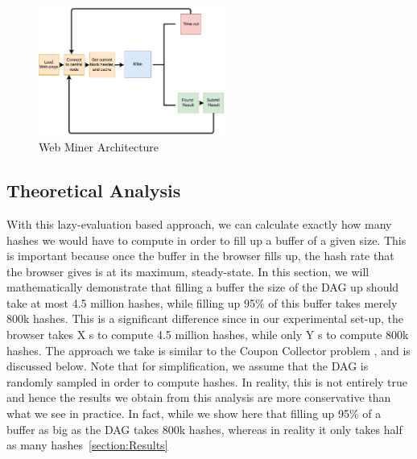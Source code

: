 \documentclass[runningheads]{llncs}
\begin{document}
\begin{figure}[h]
\centering
\includegraphics[width=230px,keepaspectratio]{Hybrid-Miner.pdf}
\caption{\label{fig:hybridArchitecture} Web Miner Architecture}
\end{figure}

\subsection{Theoretical Analysis}
With this lazy-evaluation based approach, we can calculate exactly how many hashes we would have to compute in order to fill up a buffer of a given size. This is important because once the buffer in the browser fills up, the hash rate that the browser gives is at its maximum, steady-state. In this section, we will mathematically demonstrate that filling a buffer the size of the DAG up should take at most 4.5 million hashes, while filling up 95\% of this buffer takes merely 800k hashes. This is a significant difference since in our experimental set-up, the browser takes X s to compute 4.5 million hashes, while only Y s to compute 800k hashes. The approach we take is similar to the Coupon Collector problem \cite{couponCollector}, and is discussed below. Note that for simplification, we assume that the DAG is randomly sampled in order to compute hashes. In reality, this is not entirely true and hence the results we obtain from this analysis are more conservative than what we see in practice. In fact, while we show here that filling up 95\% of a buffer as big as the DAG takes 800k hashes, whereas in reality it only takes half as many hashes~\ref{section:Results} \\
\end{document}
